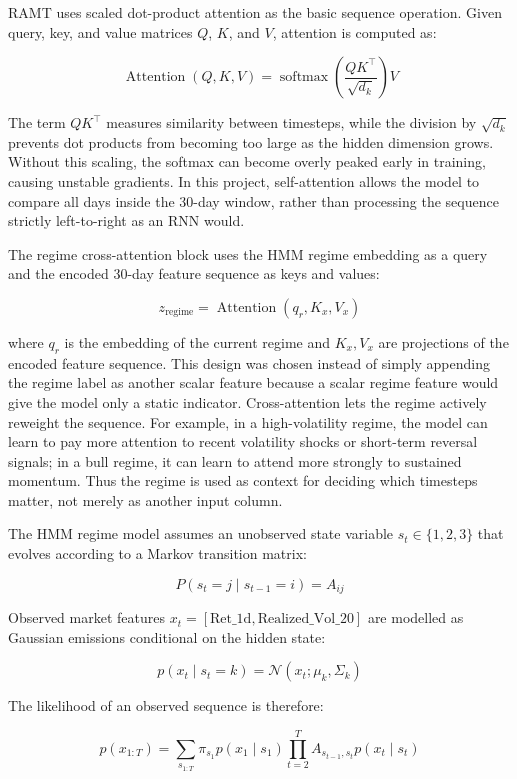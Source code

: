 \documentclass[conference]{IEEEtran}
\begin{document}
RAMT uses scaled dot-product attention as the basic sequence operation. Given query, key, and value matrices $Q$, $K$, and $V$, attention is computed as:

\[
\operatorname{Attention}(Q,K,V)
=
\operatorname{softmax}\left(\frac{QK^\top}{\sqrt{d_k}}\right)V
\]

The term $QK^\top$ measures similarity between timesteps, while the division by $\sqrt{d_k}$ prevents dot products from becoming too large as the hidden dimension grows. Without this scaling, the softmax can become overly peaked early in training, causing unstable gradients. In this project, self-attention allows the model to compare all days inside the 30-day window, rather than processing the sequence strictly left-to-right as an RNN would.

The regime cross-attention block uses the HMM regime embedding as a query and the encoded 30-day feature sequence as keys and values:

\[
z_{\text{regime}}
=
\operatorname{Attention}(q_r, K_x, V_x)
\]

where $q_r$ is the embedding of the current regime and $K_x,V_x$ are projections of the encoded feature sequence. This design was chosen instead of simply appending the regime label as another scalar feature because a scalar regime feature would give the model only a static indicator. Cross-attention lets the regime actively reweight the sequence. For example, in a high-volatility regime, the model can learn to pay more attention to recent volatility shocks or short-term reversal signals; in a bull regime, it can learn to attend more strongly to sustained momentum. Thus the regime is used as context for deciding which timesteps matter, not merely as another input column.

The HMM regime model assumes an unobserved state variable $s_t \in \{1,2,3\}$ that evolves according to a Markov transition matrix:

\[
P(s_t=j \mid s_{t-1}=i) = A_{ij}
\]

Observed market features $x_t=[\text{Ret\_1d}, \text{Realized\_Vol\_20}]$ are modelled as Gaussian emissions conditional on the hidden state:

\[
p(x_t \mid s_t=k) =
\mathcal{N}(x_t;\mu_k,\Sigma_k)
\]

The likelihood of an observed sequence is therefore:

\[
p(x_{1:T}) =
\sum_{s_{1:T}}
\pi_{s_1}p(x_1\mid s_1)
\prod_{t=2}^{T} A_{s_{t-1},s_t}p(x_t\mid s_t)
\]
\end{document}
